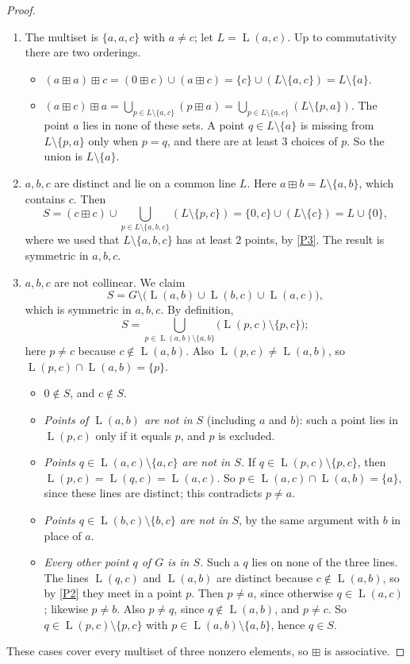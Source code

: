 \documentclass[11pt]{article}
\theoremstyle{definition}
\theoremstyle{remark}
\newcommand{\bp}{\boxplus}
\DeclareMathOperator{\Ln}{L}
\begin{document}
\begin{proof}
\begin{enumerate}[label=\textup{Case \arabic*.},ref=\arabic*,leftmargin=*]
\item\label{case2} The multiset is $\{a,a,c\}$ with $a\neq c$; let $L=\Ln(a,c)$. Up to commutativity there are two orderings.
\begin{itemize}[nosep]
\item $(a\bp a)\bp c=(0\bp c)\cup(a\bp c)=\{c\}\cup(L\setminus\{a,c\})=L\setminus\{a\}$.
\item $(a\bp c)\bp a=\bigcup_{p\in L\setminus\{a,c\}}(p\bp a)=\bigcup_{p\in L\setminus\{a,c\}}(L\setminus\{p,a\})$. The point $a$ lies in none of these sets. A point $q\in L\setminus\{a\}$ is missing from $L\setminus\{p,a\}$ only when $p=q$, and there are at least $3$ choices of $p$. So the union is $L\setminus\{a\}$.
\end{itemize}

\item\label{case3} $a,b,c$ are distinct and lie on a common line $L$. Here $a\bp b=L\setminus\{a,b\}$, which contains $c$. Then
\[
S=(c\bp c)\cup\bigcup_{p\in L\setminus\{a,b,c\}}(L\setminus\{p,c\})=\{0,c\}\cup(L\setminus\{c\})=L\cup\{0\},
\]
where we used that $L\setminus\{a,b,c\}$ has at least $2$ points, by \ref{P3}. The result is symmetric in $a,b,c$.

\item\label{case4} $a,b,c$ are not collinear. We claim
\[
S=G\setminus\bigl(\Ln(a,b)\cup\Ln(b,c)\cup\Ln(a,c)\bigr),
\]
which is symmetric in $a,b,c$. By definition,
\[
S=\bigcup_{p\in\Ln(a,b)\setminus\{a,b\}}\bigl(\Ln(p,c)\setminus\{p,c\}\bigr);
\]
here $p\neq c$ because $c\notin\Ln(a,b)$. Also $\Ln(p,c)\neq\Ln(a,b)$, so $\Ln(p,c)\cap\Ln(a,b)=\{p\}$.
\begin{itemize}[nosep]
\item $0\notin S$, and $c\notin S$.
\item \emph{Points of $\Ln(a,b)$ are not in $S$} (including $a$ and $b$): such a point lies in $\Ln(p,c)$ only if it equals $p$, and $p$ is excluded.
\item \emph{Points $q\in\Ln(a,c)\setminus\{a,c\}$ are not in $S$.} If $q\in\Ln(p,c)\setminus\{p,c\}$, then $\Ln(p,c)=\Ln(q,c)=\Ln(a,c)$. So $p\in\Ln(a,c)\cap\Ln(a,b)=\{a\}$, since these lines are distinct; this contradicts $p\neq a$.
\item \emph{Points $q\in\Ln(b,c)\setminus\{b,c\}$ are not in $S$}, by the same argument with $b$ in place of $a$.
\item \emph{Every other point $q$ of $G$ is in $S$.} Such a $q$ lies on none of the three lines. The lines $\Ln(q,c)$ and $\Ln(a,b)$ are distinct because $c\notin\Ln(a,b)$, so by \ref{P2} they meet in a point $p$. Then $p\neq a$, since otherwise $q\in\Ln(a,c)$; likewise $p\neq b$. Also $p\neq q$, since $q\notin\Ln(a,b)$, and $p\neq c$. So $q\in\Ln(p,c)\setminus\{p,c\}$ with $p\in\Ln(a,b)\setminus\{a,b\}$, hence $q\in S$.
\end{itemize}
\end{enumerate}
These cases cover every multiset of three nonzero elements, so $\bp$ is associative.
\end{proof}
\end{document}
